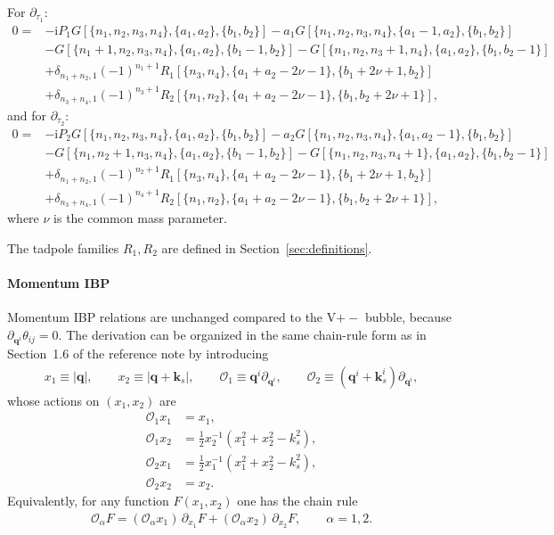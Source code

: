\documentclass[a4paper,12pt]{article}
\def\pd{\partial}
\def\ii{\mathrm{i}}
\begin{document}
For $\pd_{\tau_1}$:
\begin{align}
	0 = & - \ii P_1 G[\{n_1,n_2,n_3,n_4\},\{a_1,a_2\},\{b_1,b_2\}] - a_1G[\{n_1,n_2,n_3,n_4\},\{a_1-1,a_2\},\{b_1,b_2\}]\nonumber \\
	    & - G[\{n_1+1,n_2,n_3,n_4\},\{a_1,a_2\},\{b_1-1,b_2\}] - G[\{n_1,n_2,n_3+1,n_4\},\{a_1,a_2\},\{b_1,b_2-1\}]\nonumber      \\
	    & +\delta_{n_1+n_2,1}(-1)^{n_1+1}R_1[\{n_3,n_4\},\{a_1+a_2-2\nu-1\},\{b_1+2\nu+1,b_2\}]\nonumber                \\
	    & +\delta_{n_3+n_4,1}(-1)^{n_3+1}R_2[\{n_1,n_2\},\{a_1+a_2-2\nu-1\},\{b_1,b_2+2\nu+1\}], \label{eq:timeIBP_tau1}
\end{align}
and for $\partial_{\tau_2}$:
\begin{align}
	0 = & - \ii P_2 G[\{n_1,n_2,n_3,n_4\},\{a_1,a_2\},\{b_1,b_2\}] - a_2G[\{n_1,n_2,n_3,n_4\},\{a_1,a_2-1\},\{b_1,b_2\}]\nonumber \\
	    & - G[\{n_1,n_2+1,n_3,n_4\},\{a_1,a_2\},\{b_1-1,b_2\}] - G[\{n_1,n_2,n_3,n_4+1\},\{a_1,a_2\},\{b_1,b_2-1\}]\nonumber      \\
	    & +\delta_{n_1+n_2,1}(-1)^{n_2+1}R_1[\{n_3,n_4\},\{a_1+a_2-2\nu-1\},\{b_1+2\nu+1,b_2\}]\nonumber                \\
	    & +\delta_{n_3+n_4,1}(-1)^{n_4+1}R_2[\{n_1,n_2\},\{a_1+a_2-2\nu-1\},\{b_1,b_2+2\nu+1\}], \label{eq:timeIBP_tau2}
\end{align}
where $\nu$ is the common mass parameter.

The tadpole families $R_1,R_2$ are defined in Section~\ref{sec:definitions}.

\paragraph{Momentum IBP}
Momentum IBP relations are unchanged compared to the V$+-$ bubble, because $\pd_{\bm q^i}\theta_{ij}=0$. The derivation can be organized in the same chain-rule form as in Section~1.6 of the reference note by introducing
\begin{align}
	x_1 \equiv |\bm q|,\qquad x_2 \equiv |\bm q+\bm k_s|,\qquad
	\mathcal{O}_1 \equiv \bm q^i \pd_{\bm q^i},\qquad
	\mathcal{O}_2 \equiv (\bm q^i+\bm k_s^i)\pd_{\bm q^i},
\end{align}
whose actions on $(x_1,x_2)$ are
\begin{align}
	\mathcal{O}_1 x_1 & = x_1, \nonumber\\
	\mathcal{O}_1 x_2 & = \frac{1}{2}x_2^{-1}(x_1^2 + x_2^2 - k_s^2), \nonumber\\
	\mathcal{O}_2 x_1 & = \frac{1}{2}x_1^{-1}(x_1^2 + x_2^2 - k_s^2), \nonumber\\
	\mathcal{O}_2 x_2 & = x_2.
\end{align}
Equivalently, for any function $F(x_1,x_2)$ one has the chain rule
\begin{align}
	\mathcal{O}_\alpha F = (\mathcal{O}_\alpha x_1)\,\partial_{x_1}F + (\mathcal{O}_\alpha x_2)\,\partial_{x_2}F,\qquad \alpha=1,2.
\end{align}
\end{document}
